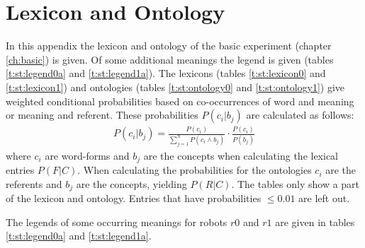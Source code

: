 \chapter{Lexicon and Ontology}\label{a:lexicon}

In this appendix the lexicon and ontology of the basic experiment (chapter \ref{ch:basic}) is given. Of some additional meanings the legend is given (tables \ref{t:st:legend0a} and \ref{t:st:legend1a}). The lexicons (tables \ref{t:st:lexicon0} and \ref{t:st:lexicon1}) and ontologies (tables \ref{t:st:ontology0} and \ref{t:st:ontology1}) give  weighted conditional probabilities based on co-occurrences of word and meaning or meaning and referent. These probabilities $P(c_i|b_j)$ are calculated as follows:
\begin{eqnarray}
P(c_i|b_j) = \frac{P(c_i)}{\sum_{j=1}^n P(c_i \wedge b_j)} \cdot \frac{P(c_i)}{P(b_j)}
\end{eqnarray}
where $c_i$ are word-forms and $b_j$ are the concepts when calculating the lexical entries $P(F|C)$. When calculating the probabilities for the ontologies $c_i$ are the referents and $b_j$ are the concepts, yielding $P(R|C)$. The tables only show a part of the lexicon and ontology. Entries that have probabilities $\leq 0.01$ are left out.

The legends of some occurring meanings for robots $r0$ and $r1$ are given in tables \ref{t:st:legend0a} and \ref{t:st:legend1a}.

